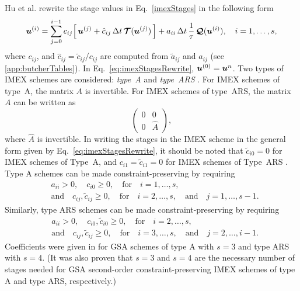 Hu et al. \cite{hu_etal_2018} rewrite the stage values in Eq.~\eqref{imexStages} in the following form
\begin{equation}
  \boldsymbol{u}^{(i)}
  =\sum_{j=0}^{i-1}c_{ij}\Big[\,\boldsymbol{u}^{(j)}+\hat{c}_{ij}\,\Delta t\,\boldsymbol{\mathcal{T}}(\boldsymbol{u}^{(j)})\,\Big]
  +a_{ii}\,\Delta t\,\frac{1}{\tau}\,\boldsymbol{\mathcal{Q}}(\boldsymbol{u}^{(i)}),\quad i=1,\ldots,s,
  \label{eq:imexStagesRewrite}
\end{equation}
where $c_{ij}$, and $\hat{c}_{ij}=\tilde{c}_{ij}/c_{ij}$ are computed from $\tilde{a}_{ij}$ and $a_{ij}$ (see \ref{app:butcherTables}).  
In Eq.~\eqref{eq:imexStagesRewrite}, $\boldsymbol{u}^{(0)}=\boldsymbol{u}^{n}$.  
Two types of IMEX schemes are considered: \emph{type~A} \cite{pareschiRusso_2005,dimarcoPareschi2013} and \emph{type~ARS} \cite{ascher_etal_1997}.  
For IMEX schemes of type~A, the matrix $A$ is invertible.  
For IMEX schemes of type~ARS, the matrix $A$ can be written as
\begin{equation*}
  \left( 
    \begin{matrix} 
       0 & 0 \\ 
       0 & \hat{A}
    \end{matrix}
  \right),
\end{equation*}
where $\hat{A}$ is invertible.  
In writing the stages in the IMEX scheme in the general form given by Eq.~\eqref{eq:imexStagesRewrite}, it should be noted that $\tilde{c}_{i0}=0$ for IMEX schemes of Type~A, and $c_{i1}=\tilde{c}_{i1}=0$ for IMEX schemes of Type~ARS \cite{hu_etal_2018}.  
Type A schemes can be made constraint-preserving by requiring 
\begin{align}
  &a_{ii}>0, \quad c_{i0}\ge0, \quad \text{for} \quad i=1,\ldots,s, \nonumber \\
  &\text{and} \quad c_{ij},\tilde{c}_{ij}\ge0, \quad \text{for} \quad i=2,\ldots,s, \quad\text{and}\quad j=1,\ldots,s-1.  
  \label{eq:positivityConditionsTypeA}
\end{align}
Similarly, type ARS schemes can be made constraint-preserving by requiring 
\begin{align}
  &a_{ii}>0, \quad c_{i0},\tilde{c}_{i0}\ge0, \quad \text{for} \quad i=2,\ldots,s, \nonumber \\
  &\text{and} \quad c_{ij},\tilde{c}_{ij}\ge0, \quad \text{for} \quad i=3,\ldots,s, \quad\text{and}\quad j=2,\ldots,i-1.  
  \label{eq:positivityConditionsTypeARS}
\end{align}
Coefficients were given in \cite{hu_etal_2018} for GSA schemes of type A with $s=3$ and type ARS with $s=4$.  
(It was also proven that $s=3$ and $s=4$ are the necessary number of stages needed for GSA second-order constraint-preserving IMEX schemes of type A and type ARS, respectively.)  

